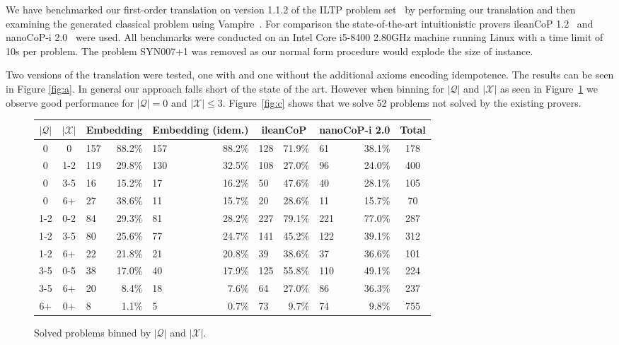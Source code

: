 \documentclass[runningheads]{llncs}
\begin{document}
We have benchmarked our first-order translation on version 1.1.2 of the ILTP problem set~\cite{iltp} by performing our translation and then examining the generated classical problem using Vampire~\cite{kovacs2013first}. For comparison the state-of-the-art intuitionistic provers ileanCoP 1.2~\cite{otten2008leancop} and nanoCoP-i 2.0~\cite{otten2021nanocop} were used. All benchmarks were conducted on an Intel Core i5-8400 2.80GHz machine running Linux with a time limit of 10s per problem. The problem \textsc{SYN007+1} was removed as our normal form procedure would explode the size of instance.

Two versions of the translation were tested, one with and one without the additional axioms encoding idempotence. The results can be seen in Figure \ref{fig:a}. In general our approach falls short of the state of the art. However when binning for $|\mathcal Q|$ and $|\mathcal X|$ as seen in Figure~\ref{fig:b} we observe good performance for $|\mathcal Q| = 0$ and $|\mathcal X| \leq 3$. Figure~\ref{fig:c} shows that we solve 52 problems not solved by the existing provers.
\begin{figure}
	\centering
	\begin{tabular}{c|c|lr|lr|lr|lr|c}
		$|\mathcal Q|$&$|\mathcal X|$&\multicolumn{2}{c}{Embedding}&\multicolumn{2}{c}{Embedding (idem.)}&\multicolumn{2}{c}{ileanCoP}&\multicolumn{2}{c}{nanoCoP-i 2.0}&Total\\\hline
		0&0		&157&88.2\%	&157&88.2\%		&128&71.9\%		&61&38.1\%	&178\\
		0&1-2	&119&29.8\%&130&32.5\%		&108&27.0\%		&96&24.0\%	&400\\
		0&3-5	&16&15.2\%	&17&16.2\%		&50&47.6\%		&40&28.1\%	&105\\
		0&6+	&27&38.6\%	&11&15.7\%		&20&28.6\%		&11&15.7\%	&70\\
		1-2&0-2	&84&29.3\%	&81&28.2\%		&227&79.1\%		&221&77.0\%	&287\\
		1-2&3-5	&80&25.6\%	&77&24.7\%		&141&45.2\%		&122&39.1\%	&312\\
		1-2&6+	&22&21.8\%	&21&20.8\%		&39&38.6\%		&37&36.6\%	&101\\
		3-5&0-5	&38&17.0\%	&40&17.9\%		&125&55.8\%		&110&49.1\%	&224\\
		3-5&6+  &20&8.4\%	&18&7.6\%		&64&27.0\%		&86&36.3\%	&237\\
		6+&0+	&8&1.1\%	&5&0.7\%		&73&9.7\%		&74&9.8\%	&755
	\end{tabular}
	\caption{Solved problems binned by $|\mathcal Q|$ and $|\mathcal X|$.}
	\label{fig:b}
\end{figure}
\end{document}
